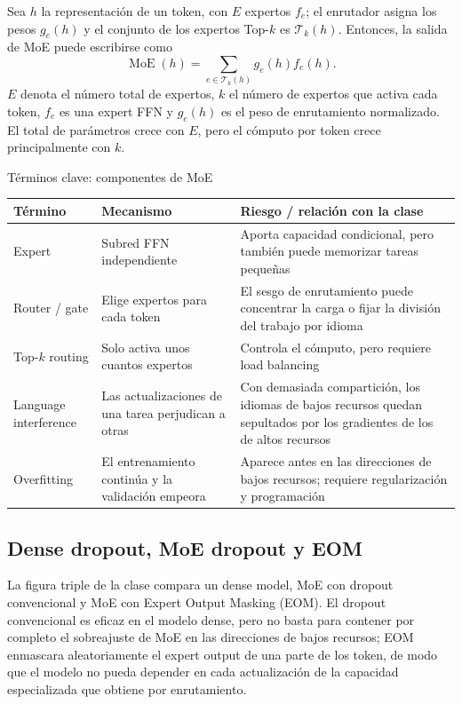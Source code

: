 \documentclass[a4paper]{article}
\begin{document}
Sea $h$ la representación de un token, con $E$ expertos $f_e$; el enrutador asigna los pesos $g_e(h)$ y el conjunto de los expertos Top-$k$ es $\mathcal{T}_k(h)$. Entonces, la salida de MoE puede escribirse como
\[
\operatorname{MoE}(h)=\sum_{e\in\mathcal{T}_k(h)} g_e(h)f_e(h).
\]
$E$ denota el número total de expertos, $k$ el número de expertos que activa cada token, $f_e$ es una expert FFN y $g_e(h)$ es el peso de enrutamiento normalizado. El total de parámetros crece con $E$, pero el cómputo por token crece principalmente con $k$.

\begin{knowledgebox}{Términos clave: componentes de MoE}
\begin{tabularx}{\textwidth}{@{}L{0.21\textwidth}L{0.26\textwidth}X@{}}
\toprule
Término & Mecanismo & Riesgo / relación con la clase \\
\midrule
Expert & Subred FFN independiente & Aporta capacidad condicional, pero también puede memorizar tareas pequeñas \\
Router / gate & Elige expertos para cada token & El sesgo de enrutamiento puede concentrar la carga o fijar la división del trabajo por idioma \\
Top-$k$ routing & Solo activa unos cuantos expertos & Controla el cómputo, pero requiere load balancing \\
Language interference & Las actualizaciones de una tarea perjudican a otras & Con demasiada compartición, los idiomas de bajos recursos quedan sepultados por los gradientes de los de altos recursos \\
Overfitting & El entrenamiento continúa y la validación empeora & Aparece antes en las direcciones de bajos recursos; requiere regularización y programación \\
\bottomrule
\end{tabularx}
\end{knowledgebox}

\subsection{Dense dropout, MoE dropout y EOM}

La figura triple de la clase compara un dense model, MoE con dropout convencional y MoE con Expert Output Masking (EOM). El dropout convencional es eficaz en el modelo dense, pero no basta para contener por completo el sobreajuste de MoE en las direcciones de bajos recursos; EOM enmascara aleatoriamente el expert output de una parte de los token, de modo que el modelo no pueda depender en cada actualización de la capacidad especializada que obtiene por enrutamiento.
\end{document}
